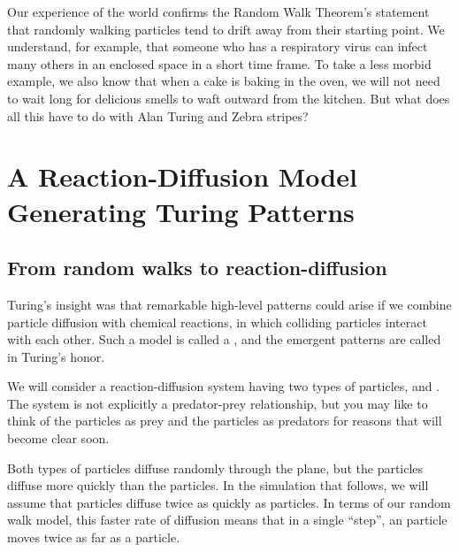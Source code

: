 Our experience of the world confirms the Random Walk Theorem's statement that randomly walking particles tend to drift away from their starting point. We understand, for example, that someone who has a respiratory virus can infect many others in an enclosed space in a short time frame. To take a less morbid example, we also know that when a cake is baking in the oven, we will not need to wait long for delicious smells to waft outward from the kitchen. But what does all this have to do with Alan Turing and Zebra stripes?\\

\FloatBarrier
{}

\section{A Reaction-Diffusion Model Generating Turing Patterns}
\label{sec:a_reaction-diffusion_model_generating_turing_patterns}

\subsection{From random walks to reaction-diffusion}

Turing's insight was that remarkable high-level patterns could arise if we combine particle diffusion with chemical reactions, in which colliding particles interact with each other. Such a model is called a , and the emergent patterns are called  in Turing's honor.

We will consider a reaction-diffusion system having two types of particles,  and . The system is not explicitly a predator-prey relationship, but you may like to think of the  particles as prey and the  particles as predators for reasons that will become clear soon.

Both types of particles diffuse randomly through the plane, but the  particles diffuse more quickly than the  particles.  In the simulation that follows, we will assume that  particles diffuse twice as quickly as  particles. In terms of our random walk model, this faster rate of diffusion means that in a single ``step'', an  particle moves twice as far as a  particle.\\

